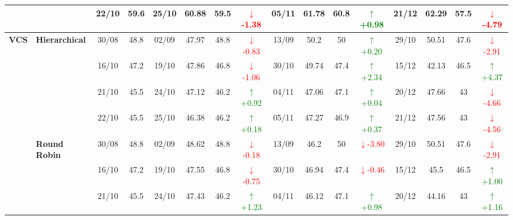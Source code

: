{\begin{longtable}{llcc|cccc|cccc|cccc}
&
& 22/10 & 59.6 & 25/10 & 60.88 & 59.5 & \textcolor{red}{\(\downarrow\)-1.38} & 05/11 & 61.78 & 60.8 & \textcolor{green}{\(\uparrow\)+0.98} & 21/12 & 62.29 & 57.5 & \textcolor{red}{\(\downarrow\)-4.79} \\
\midrule



\multirow{12}{*}{\textbf{VCS}} 
& \textbf{Hierarchical}
& 30/08 & 48.8 & 02/09 & 47.97 & 48.8 & \textcolor{red}{\(\downarrow\)-0.83} & 13/09 & 50.2 & 50 & \textcolor{green}{\(\uparrow\)+0.20} & 29/10 & 50.51 & 47.6 & \textcolor{red}{\(\downarrow\)-2.91} \\

&
& 16/10 & 47.2 & 19/10 & 47.86 & 46.8 & \textcolor{red}{\(\downarrow\)-1.06} & 30/10 & 49.74 & 47.4 & \textcolor{green}{\(\uparrow\)+2.34} & 15/12 & 42.13 & 46.5 & \textcolor{green}{\(\uparrow\)+4.37} \\

&
& 21/10 & 45.5 & 24/10 & 47.12 & 46.2 & \textcolor{green}{\(\uparrow\)+0.92} & 04/11 & 47.06 & 47.1 & \textcolor{green}{\(\uparrow\)+0.04} & 20/12 & 47.66 & 43 & \textcolor{red}{\(\downarrow\)-4.66} \\

&
& 22/10 & 45.5 & 25/10 & 46.38 & 46.2 & \textcolor{green}{\(\uparrow\)+0.18} & 05/11 & 47.27 & 46.9 & \textcolor{green}{\(\uparrow\)+0.37} & 21/12 & 47.56 & 43 & \textcolor{red}{\(\downarrow\)-4.56} \\
\cmidrule(lr){2-16}


& \textbf{Round Robin}
& 30/08 & 48.8 & 02/09 & 48.62 & 48.8 & \textcolor{red}{\(\downarrow\)-0.18} & 13/09 & 46.2 & 50 & \textcolor{red}{\(\downarrow\)-3.80} & 29/10 & 50.51 & 47.6 & \textcolor{red}{\(\downarrow\)-2.91} \\

&
& 16/10 & 47.2 & 19/10 & 47.55 & 46.8 & \textcolor{red}{\(\downarrow\)-0.75} & 30/10 & 46.94 & 47.4 & \textcolor{red}{\(\downarrow\)-0.46} & 15/12 & 45.5 & 46.5 & \textcolor{green}{\(\uparrow\)+1.00} \\

&
& 21/10 & 45.5 & 24/10 & 47.43 & 46.2 & \textcolor{green}{\(\uparrow\)+1.23} & 04/11 & 46.12 & 47.1 & \textcolor{green}{\(\uparrow\)+0.98} & 20/12 & 44.16 & 43 & \textcolor{green}{\(\uparrow\)+1.16} \\


\end{longtable}}
